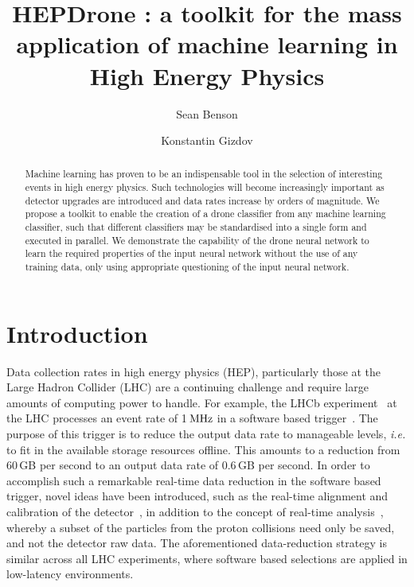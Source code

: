 \documentclass[final,5p,times,twocolumn]{elsarticle}
\def\lhcb {\mbox{LHCb}\xspace}
\def\mhz  {\ensuremath{{\rm \,MHz}}\xspace}
\newcommand{\ie}{\mbox{\itshape i.e.}\xspace}
\begin{document}

\begin{frontmatter}
\author[nl]{Sean Benson}
\author[uoe]{Konstantin Gizdov}
\address[nl]{Nikhef National Institute for Subatomic Physics, Amsterdam, The Netherlands}
\address[uoe]{School of Physics and Astronomy, University of Edinburgh, Edinburgh, United Kingdom}
\title{HEPDrone : a toolkit for the mass application of machine learning in High Energy Physics}
\begin{abstract}
  \noindent
  Machine learning has proven to be an indispensable tool in the selection of
  interesting events in high energy physics. Such technologies will become increasingly
  important as detector upgrades are introduced and data rates increase by orders of magnitude.
  We propose a toolkit to enable the creation of a drone classifier from any machine learning
  classifier, such that different classifiers may be standardised into a single form and executed
  in parallel. We demonstrate the capability of the drone neural network 
  to learn the required properties of the input neural network without
  the use of any training data, only using appropriate questioning of the input neural network.
\end{abstract}
\end{frontmatter}

\section{Introduction}
\label{sec:intro}

Data collection rates in high energy physics (HEP), particularly those at the Large Hadron Collider (LHC)
are a continuing challenge and require large amounts of computing power to handle.
For example, the \lhcb experiment~\cite{Alves:2008zz} at the LHC processes an event rate of 1\mhz in a software
based trigger~\cite{LHCb-DP-2014-002}. The purpose of this trigger is to reduce the output
data rate to manageable levels, \ie to fit in the available storage resources offline.
This amounts to a reduction from 60\,GB per second to an output data rate of 0.6\,GB per second. 
In order to accomplish such a remarkable real-time data reduction in the software based trigger,
novel ideas have been introduced, such as the real-time alignment and calibration of the detector~\cite{Xu:2016mik},
in addition to the concept of real-time analysis~\cite{Aaij:2016rxn}, whereby a subset of the particles from the proton collisions need only
be saved, and not the detector raw data.
The aforementioned data-reduction strategy is similar across all LHC experiments, where
software based selections are applied in low-latency environments.
\end{document}
